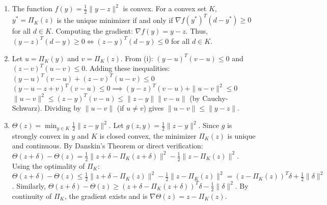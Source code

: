 \begin{solution}
\begin{enumerate}
    \item[(i)] The function $f(y) = \frac{1}{2}\|y-z\|^2$ is convex. For a convex set $K$, $y^* = \Pi_K(z)$ is the unique minimizer if and only if $\nabla f(y^*)^T(d - y^*) \geq 0$ for all $d \in K$.
    Computing the gradient: $\nabla f(y) = y - z$.
    Thus, $(y - z)^T(d - y) \geq 0 \iff (z - y)^T(d - y) \leq 0$ for all $d \in K$.

    \item[(ii)] Let $u = \Pi_K(y)$ and $v = \Pi_K(z)$. From (i):
    $(y - u)^T(v - u) \leq 0$ and $(z - v)^T(u - v) \leq 0$.
    Adding these inequalities:
    $(y - u)^T(v - u) + (z - v)^T(u - v) \leq 0$
    $(y - u - z + v)^T(v - u) \leq 0 \implies (y - z)^T(v - u) + \|u - v\|^2 \leq 0$
    $\|u - v\|^2 \leq (z - y)^T(v - u) \leq \|z - y\| \|v - u\|$ (by Cauchy-Schwarz).
    Dividing by $\|u - v\|$ (if $u \neq v$) gives $\|u - v\| \leq \|y - z\|$.

    \item[(iii)] $\Theta(z) = \min_{y \in K} \frac{1}{2}\|z - y\|^2$. Let $g(z, y) = \frac{1}{2}\|z - y\|^2$. Since $g$ is strongly convex in $y$ and $K$ is closed convex, the minimizer $\Pi_K(z)$ is unique and continuous. By Danskin's Theorem or direct verification:
    $\Theta(z + \delta) - \Theta(z) = \frac{1}{2}\|z + \delta - \Pi_K(z + \delta)\|^2 - \frac{1}{2}\|z - \Pi_K(z)\|^2$.
    Using the optimality of $\Pi_K$:
    $\Theta(z + \delta) - \Theta(z) \leq \frac{1}{2}\|z + \delta - \Pi_K(z)\|^2 - \frac{1}{2}\|z - \Pi_K(z)\|^2 = (z - \Pi_K(z))^T \delta + \frac{1}{2}\|\delta\|^2$.
    Similarly, $\Theta(z + \delta) - \Theta(z) \geq (z + \delta - \Pi_K(z + \delta))^T \delta - \frac{1}{2}\|\delta\|^2$.
    By continuity of $\Pi_K$, the gradient exists and is $\nabla \Theta(z) = z - \Pi_K(z)$.
\end{enumerate}
\end{solution}

